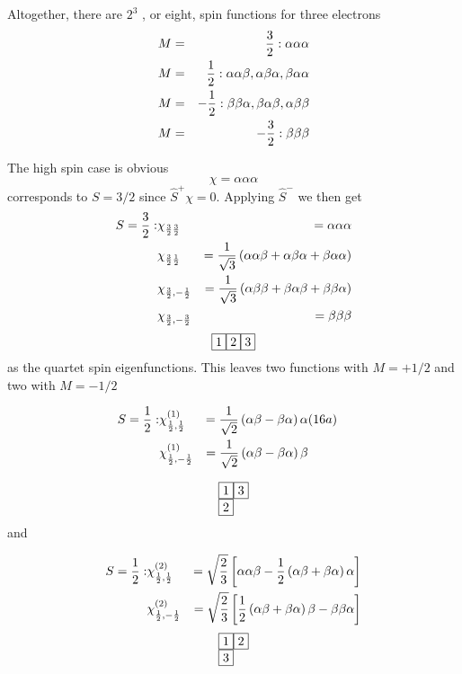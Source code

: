 Altogether, there are $2^3$ , or eight, spin functions for three 
electrons
\begin{eqnarray}
M &=& {3 \over 2} : \alpha \alpha \alpha\cr
M &=& {1 \over 2} : \alpha \alpha \beta , \alpha \beta \alpha , \beta 
\alpha \alpha\cr
M &=& - {1 \over 2} : \beta \beta \alpha , \beta \alpha \beta , \alpha 
\beta \beta\cr
M &=& - {3 \over 2} : \beta \beta \beta
\end{eqnarray}

The high spin case is obvious
\begin{equation}
\chi = \alpha \alpha \alpha
\end{equation}
corresponds to $S = 3/2$ since ${\hat S}^+ \chi = 0$.  Applying 
${\hat S}^-$ we then get
\begin{eqnarray}
S = {3 \over 2}: &\chi_{{3 \over 2} {3 \over 2}} &= \alpha \alpha 
\alpha\cr
&\chi_{{3 \over 2} {1 \over 2}} &= {1 \over \sqrt{3}} \left( \alpha 
\alpha \beta + \alpha \beta \alpha + \beta \alpha \alpha \right)\cr
&\chi_{{3 \over 2} , - {1 \over 2}} &= {1 \over \sqrt{3}} \left( 
\alpha \beta \beta + \beta \alpha \beta + \beta \beta \alpha \right)\cr
&\chi_{{3 \over 2} , - {3 \over 2}} &= \beta \beta \beta
\label{chap4app-eqno15}
\end{eqnarray}
\begin{equation}
\fbox{1}\fbox{2}\fbox{3}
\end{equation}
as the quartet spin eigenfunctions. This leaves two functions with 
$M = + 1/2$ and two with $M = - 1/2$

\begin{eqnarray}
S = {1 \over 2} : &\chi^{(1)}_{{1 \over 2} , {1 \over 2}} & = {1 \over 
\sqrt{2}} \left( \alpha \beta - \beta \alpha \right) \alpha & (16a)\cr
&\chi^{(1)}_{{1 \over 2} , - {1 \over 2}} & = {1 \over \sqrt{2}} \left( 
\alpha \beta - \beta \alpha \right) \beta 
\end{eqnarray}

\begin{equation}
\begin{tabular}{l}
\fbox{1}\fbox{3} \\
\fbox{2}
\end{tabular}
\end{equation}
and

\begin{eqnarray}
S = {1 \over 2} : &\chi^{(2)}_{{1 \over 2},{1 \over 2}} &= \sqrt{{2 
\over 3}} \left[ \alpha \alpha \beta - {1 \over 2} \left( \alpha 
\beta + \beta \alpha \right) \alpha \right] \cr
&\chi^{(2)}_{{1 \over 2},-{1 \over 2}} &= \sqrt{{2 \over 3}} 
\left[ {1 \over 2} \left( \alpha \beta + \beta \alpha \right) 
\beta - \beta \beta \alpha \right]
\end{eqnarray}
\begin{equation}
\begin{tabular}{l}
\fbox{1}\fbox{2} \\
\fbox{3}
\end{tabular}
\end{equation}


